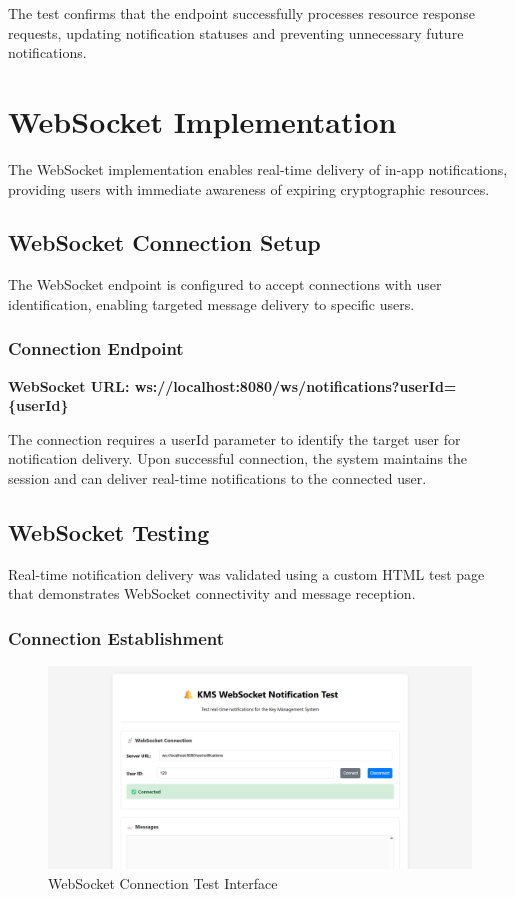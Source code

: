 The test confirms that the endpoint successfully processes resource response requests, updating notification statuses and preventing unnecessary future notifications.

\section{WebSocket Implementation}

The WebSocket implementation enables real-time delivery of in-app notifications, providing users with immediate awareness of expiring cryptographic resources.

\subsection{WebSocket Connection Setup}

The WebSocket endpoint is configured to accept connections with user identification, enabling targeted message delivery to specific users.

\subsubsection{Connection Endpoint}

\textbf{WebSocket URL: ws://localhost:8080/ws/notifications?userId=\{userId\}}

The connection requires a userId parameter to identify the target user for notification delivery. Upon successful connection, the system maintains the session and can deliver real-time notifications to the connected user.

\subsection{WebSocket Testing}

Real-time notification delivery was validated using a custom HTML test page that demonstrates WebSocket connectivity and message reception.

\subsubsection{Connection Establishment}

\begin{figure}[H]
    \centering
    \includegraphics[width=1\textwidth]{images/websocket_connection.png}
    \caption{WebSocket Connection Test Interface}
    \label{fig:websocket_connection}
\end{figure}

